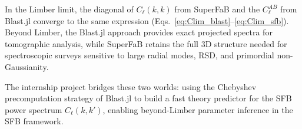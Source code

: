In the Limber limit, the diagonal of $C_\ell(k,k)$ from SuperFaB
and the $C_\ell^{AB}$ from Blast.jl converge to the same expression
(Eqs.~\eqref{eq:Clim_blast}--\eqref{eq:Clim_sfb}).
Beyond Limber, the Blast.jl approach provides exact projected spectra
for tomographic analysis, while SuperFaB retains the full 3D
structure needed for spectroscopic surveys sensitive to large radial
modes, RSD, and primordial non-Gaussianity.

The internship project bridges these two worlds: using the Chebyshev
precomputation strategy of Blast.jl to build a fast theory predictor
for the SFB power spectrum $C_\ell(k,k')$, enabling beyond-Limber
parameter inference in the SFB framework.